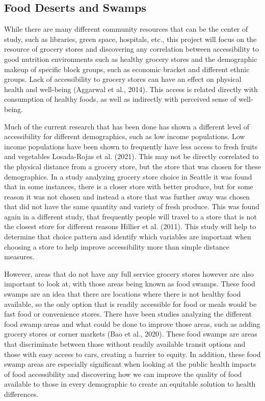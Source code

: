\documentclass[
  letterpaper,
  DIV=11,
  numbers=noendperiod]{scrreport}
\begin{document}
\hypertarget{food-deserts-and-swamps}{%
\subsection{Food Deserts and Swamps}\label{food-deserts-and-swamps}}

While there are many different community resources that can be the
center of study, such as libraries, green space, hospitals, etc., this
project will focus on the resource of grocery stores and discovering any
correlation between accessibility to good nutrition environments such as
healthy grocery stores and the demographic makeup of specific block
groups, such as economic bracket and different ethnic groups. Lack of
accessibility to grocery stores can have an effect on physical health
and well-being (Aggarwal et al., 2014). This access is related directly
with consumption of healthy foods, as well as indirectly with perceived
sense of well-being.

Much of the current research that has been done has shown a different
level of accessibility for different demographics, such as low income
populations. Low income populations have been shown to frequently have
less access to fresh fruits and vegetables Losada-Rojas et al. (2021).
This may not be directly correlated to the physical distance from a
grocery store, but the store that was chosen for these demographics. In
a study analyzing grocery store choice in Seattle it was found that in
some instances, there is a closer store with better produce, but for
some reason it was not chosen and instead a store that was further away
was chosen that did not have the same quantity and variety of fresh
produce. This was found again in a different study, that frequently
people will travel to a store that is not the closest store for
different reasons Hillier et al. (2011). This study will help to
determine that choice pattern and identify which variables are important
when choosing a store to help improve accessibility more than simple
distance measures.

However, areas that do not have any full service grocery stores however
are also important to look at, with those areas being known as food
swamps. These food swamps are an idea that there are locations where
there is not healthy food available, so the only option that is readily
accessible for food or meals would be fast food or convenience stores.
There have been studies analyzing the different food swamp areas and
what could be done to improve those areas, such as adding grocery stores
or corner markets (Bao et al., 2020). These food swamps are areas that
discriminate between those without readily available transit options and
those with easy access to cars, creating a barrier to equity. In
addition, these food swamp areas are especially significant when looking
at the public health impacts of food accessibility and discovering how
we can improve the quality of food available to those in every
demographic to create an equitable solution to health differences.
\end{document}
